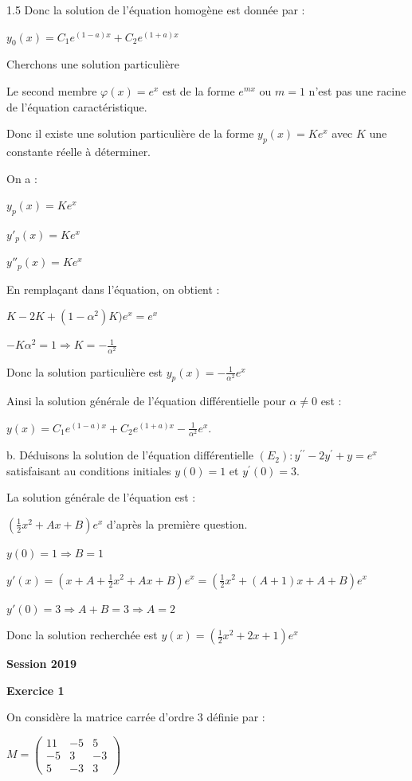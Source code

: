 \documentclass[12pt]{article}
\begin{document}
\begin{spacing}{1.5}
Donc la solution de l'équation homogène est donnée par :

$y_0(x)=C_1e^{(1-a)x}+C_2e^{(1+a)x}$

\medskip
Cherchons une solution particulière

Le second membre $\varphi (x)=e^x$ est de la forme $e^{mx}$ ou $m=1$ n'est pas une racine de l'équation caractéristique.

Donc il existe une solution particulière de la forme $y_p(x)=Ke^x$ avec $K$ une constante réelle à déterminer.

On a :

$y_p(x)=Ke^x$

$y'_p(x)=Ke^x$

$y''_p(x)=Ke^x$

En remplaçant dans l'équation, on obtient :

$K-2K+(1-\alpha^2)K)e^x=e^x$

$-K\alpha^2=1\Longrightarrow K=-\frac{1}{\alpha^2}$

Donc la solution particulière est $y_p(x)=-\frac{1}{\alpha^2}e^x$

Ainsi la solution générale de l'équation différentielle pour $\alpha\neq 0$ est :

$y(x)=C_1e^{(1-a)x}+C_2e^{(1+a)x}-\frac{1}{\alpha^2}e^x$.

b. Déduisons la solution de l'équation différentielle $(E_2):y^{\prime\prime} -2y^{\prime}+y=e^x$ satisfaisant au conditions initiales $y(0)=1$ et $y^\prime(0)=3$.


La solution générale de l'équation est :

$(\frac{1}{2}x^2+Ax+B)e^x$ d'après la première question.

$y(0)=1\Rightarrow B=1$

$y'(x)=(x+A+\frac{1}{2}x^2+Ax+B)e^x=(\frac{1}{2}x^2+(A+1)x+A+B)e^x$

$y'(0)=3\Longrightarrow A+B=3\Longrightarrow A=2$

Donc la solution recherchée est $y(x)=(\frac{1}{2}x^2+2x+1)e^x$

\medskip
\textbf{Session 2019}

\textbf{Exercice 1}

On considère la matrice carrée d'ordre 3 définie par  : 

$M=\begin{pmatrix}
11 & -5 & 5 \\ 
-5 & 3 & -3 \\ 
5 & -3 & 3
\end{pmatrix}$


\end{spacing}
\end{document}
